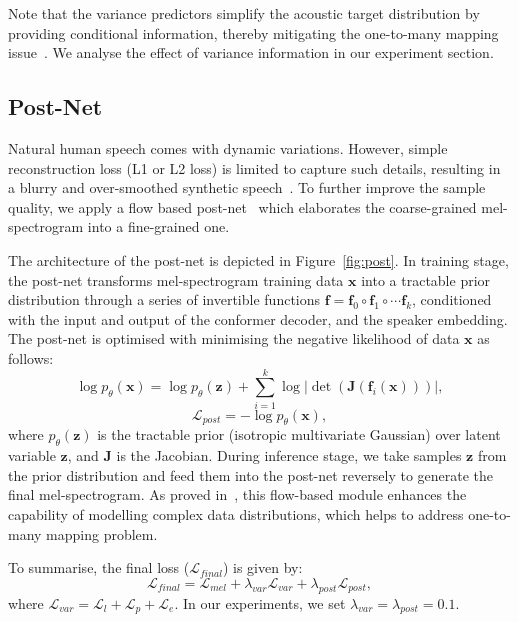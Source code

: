 \documentclass[letterpaper]{article} %
\begin{document}
Note that the variance predictors simplify the acoustic target distribution by providing conditional information, thereby mitigating the one-to-many mapping issue~\cite{ren2022revisiting}.
We analyse the effect of variance information in our experiment section.



\subsection{Post-Net}
Natural human speech comes with dynamic variations. However, simple reconstruction loss (L1 or L2 loss) is limited to capture such details, resulting in a blurry and over-smoothed synthetic speech~\cite{liu2022diffsinger}.
To further improve the sample quality, we apply a flow based post-net~\cite{ren2021portaspeech} which elaborates the coarse-grained mel-spectrogram into a fine-grained one.

The architecture of the post-net is depicted in Figure~\ref{fig:post}. In training stage, the post-net transforms mel-spectrogram training data $\boldsymbol{x}$ into a tractable prior distribution through a series of invertible functions $\mathbf{f}=\mathbf{f}_0\circ\mathbf{f}_1\circ\cdots\mathbf{f}_k$, conditioned with the input and output of the conformer decoder, and the speaker embedding. The post-net is optimised with minimising the negative likelihood of data $\boldsymbol{x}$ as follows:
\begin{equation}
    \log p_{\theta}(\boldsymbol{x}) = \log p_{\theta}(\boldsymbol{z}) + \sum_{i=1}^{k}\log |\det(\boldsymbol{J}(\mathbf{f}_i(\boldsymbol{x})))|,
\end{equation}
\begin{equation}
    \mathcal{L}_{post} = - \log p_{\theta}(\boldsymbol{x}),
\end{equation}
where $p_{\theta}(\boldsymbol{z})$ is the tractable prior (isotropic multivariate Gaussian) over latent variable $\boldsymbol{z}$, and $\boldsymbol{J}$ is the Jacobian. During inference stage, we take samples $\boldsymbol{z}$ from the prior distribution and feed them into the post-net reversely to generate the final mel-spectrogram. As proved in~\cite{ren2022revisiting}, this flow-based module enhances the capability of modelling complex data distributions, which helps to address one-to-many mapping problem.

To summarise, the final loss ($\mathcal{L}_{final}$) is given by:
\begin{equation}
    \mathcal{L}_{final} = \mathcal{L}_{mel} + \lambda_{var}\mathcal{L}_{var} + \lambda_{post}\mathcal{L}_{post},
\end{equation}
where $\mathcal{L}_{var}=\mathcal{L}_{l}+\mathcal{L}_{p}+\mathcal{L}_{e}$. In our experiments, we set $\lambda_{var} = \lambda_{post} = 0.1$.
\end{document}

